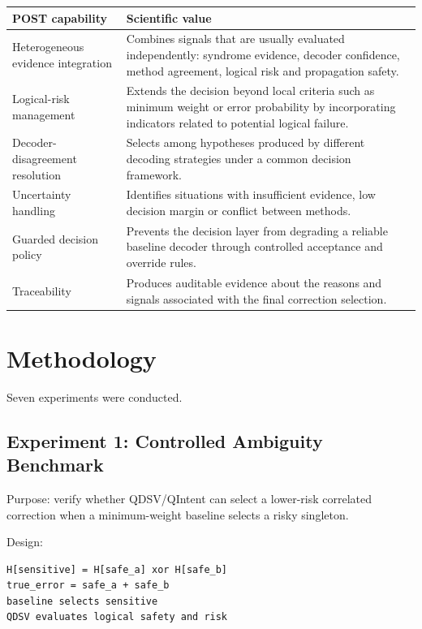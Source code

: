 \documentclass[11pt]{article}
\begin{document}
\begin{small}
\begin{longtable}{>{\raggedright\arraybackslash}p{}>{\raggedright\arraybackslash}p{}}
\toprule
POST capability & Scientific value \\
\midrule
Heterogeneous evidence integration & Combines signals that are usually evaluated independently: syndrome evidence, decoder confidence, method agreement, logical risk and propagation safety. \\
Logical-risk management & Extends the decision beyond local criteria such as minimum weight or error probability by incorporating indicators related to potential logical failure. \\
Decoder-disagreement resolution & Selects among hypotheses produced by different decoding strategies under a common decision framework. \\
Uncertainty handling & Identifies situations with insufficient evidence, low decision margin or conflict between methods. \\
Guarded decision policy & Prevents the decision layer from degrading a reliable baseline decoder through controlled acceptance and override rules. \\
Traceability & Produces auditable evidence about the reasons and signals associated with the final correction selection. \\
\bottomrule
\end{longtable}
\end{small}


\section{Methodology}

Seven experiments were conducted.


\subsection{Experiment 1: Controlled Ambiguity Benchmark}

Purpose: verify whether QDSV/QIntent can select a lower-risk correlated correction when a minimum-weight baseline selects a risky singleton.


Design:


\begin{lstlisting}
H[sensitive] = H[safe_a] xor H[safe_b]
true_error = safe_a + safe_b
baseline selects sensitive
QDSV evaluates logical safety and risk
\end{lstlisting}
\end{document}
